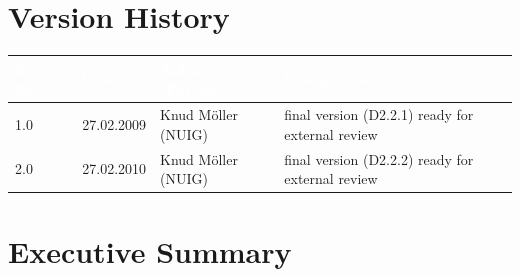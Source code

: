 \documentclass{fast_latex}
\begin{document}


\section*{Version History}

\begin{small}
\begin{tabular}{|l|l|l|p{7.5cm}|}
\hline
\rowcolor{fast@lightgrey}\textcolor{white}{\textbf{Rev. No.}} &
                            \textcolor{white}{\textbf{Date}} &
                            \textcolor{white}{\textbf{Author (Partner)}} &
							\textcolor{white}{\textbf{Change description}}\\ \hline
1.0 & 27.02.2009 & Knud M\"oller (NUIG) & final version (D2.2.1) ready for external review \\ \hline
2.0 & 27.02.2010 & Knud M\"oller (NUIG) & final version (D2.2.2) ready for external review \\ \hline
\end{tabular}
\end{small}

\color{black}

\vfill

\newpage


\clearpage

\section*{Executive Summary}
\doublespacing
\end{document}
